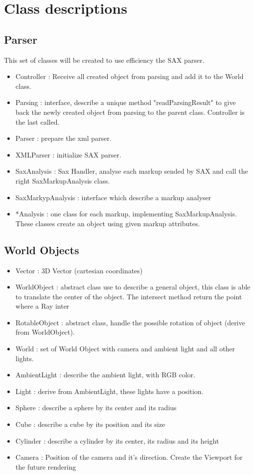 \section{Class descriptions}

  \subsection{Parser}

This set of classes will be created to use efficiency the SAX parser.

\begin{itemize}
  \item Controller : Receive all created object from parsing and add it to the World class. 
  \item Parsing : interface, describe a unique method "readParsingResult" to give back the newly created object from parsing to the parent class. Controller is the last called.
  \item Parser : prepare the xml parser.
  \item XMLParser : initialize SAX parser.
  \item SaxAnalysis : Sax Handler, analyse each markup sended by SAX and call the right SaxMarkupAnalysis class.
  \item SaxMarkypAnalysis : interface which describe a markup analyser
  \item *Analysis : one class for each markup, implementing SaxMarkupAnalysis. These classes create an object using given markup attributes.
\end{itemize}

  \subsection{World Objects}

\begin{itemize}
  \item Vector : 3D Vector (cartesian coordinates)
  \item WorldObject : abstract class use to describe a general object, this class is able to translate the center of the object. The intersect method return the point where a Ray inter
  \item RotableObject : abstract class, handle the possible rotation of object (derive from WorldObject).
  \item World : set of World Object with camera and ambient light and all other lights.
  \item AmbientLight : describe the ambient light, with RGB color.
  \item Light : derive from AmbientLight, these lights have a position.
  \item Sphere : describe a sphere by its center and its radius
  \item Cube : describe a cube by its position and its size
  \item Cylinder : describe a cylinder by its center, its radius and its height
  \item Camera : Position of the camera and it's direction. Create the Viewport for the future rendering

\end{itemize}

